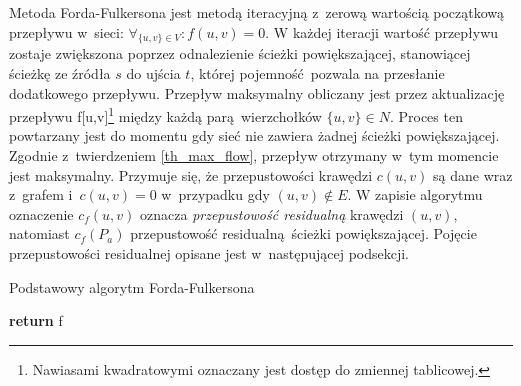 \par{
  Metoda Forda-Fulkersona jest metodą iteracyjną z~zerową wartością początkową przepływu w~sieci: $\forall_{\{u,v\}\in V}: f(u,v)=0$.
  W każdej iteracji wartość przepływu zostaje zwiększona poprzez odnalezienie ścieżki powiększającej, stanowiącej ścieżkę ze źródła $s$ do ujścia $t$, której pojemność pozwala na przesłanie dodatkowego przepływu.
  Przepływ maksymalny obliczany jest przez aktualizację przepływu f[u,v]\footnote{Nawiasami kwadratowymi oznaczany jest dostęp do zmiennej tablicowej.} między każdą parą wierzchołków $\{u,v\} \in N$.
  Proces ten powtarzany jest do momentu gdy sieć nie zawiera żadnej ścieżki powiększającej.
  Zgodnie z~twierdzeniem \ref{th_max_flow}, przepływ otrzymany w~tym momencie jest maksymalny.
  Przymuje się, że przepustowości krawędzi $c(u, v)$ są dane wraz z~grafem i~$c(u, v)=0$ w~przypadku gdy $(u, v) \notin E$.
  W zapisie algorytmu oznaczenie $c_f(u, v)$ oznacza \emph{przepustowość residualną} krawędzi $(u, v)$, natomiast $c_f(P_a)$ przepustowość residualną ścieżki powiększającej.
  Pojęcie przepustowości residualnej opisane jest w~następującej podsekcji.
  \begin{algorithm}
    \caption{Podstawowy algorytm Forda-Fulkersona}\label{alg_fordFulkerson}
    \begin{algorithmic}[1]



        \Do
        \EndFor
          \Do
            \Do
          \EndFor
        \EndWhile
        \State\textbf{return} f
      \EndFunction
  \end{algorithmic}
  \end{algorithm}
}
